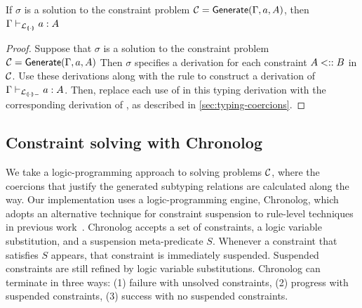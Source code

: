 \documentclass[runningheads]{llncs}
\begin{document}
\begin{lemma}
  \label{lem:generate-soundness}
  If $\sigma$ is a solution to the constraint problem $\mathcal{C} = \textsf{Generate}(\Gamma, a, A)$, then $\Gamma \vdash_{\mathcal{L}_{{\llparenthesis \cdot \rrparenthesis}}} a : A$
\end{lemma}
\begin{proof}
  Suppose that $\sigma$ is a solution to the constraint problem $\mathcal{C} = \textsf{Generate}(\Gamma, a, A)$
  Then $\sigma$ specifies a derivation for each constraint $A \mathrel{<::} B$ in $\mathcal{C}$.
  Use these derivations along with the rule  to construct a derivation of $\Gamma \vdash_{\mathcal{L}_{{\llparenthesis \cdot \rrparenthesis-}}} a : A$.
  Then, replace each use of  in this typing derivation with the corresponding derivation of , as described in \ref{sec:typing-coercions}.
\end{proof}



\subsection{Constraint solving with Chronolog}

We take a logic-programming approach to solving problems $\mathcal{C}$, where the coercions that justify the generated subtyping relations are
calculated along the way.
Our implementation uses a logic-programming engine, Chronolog, which adopts an alternative technique for constraint suspension to rule-level techniques in previous work~\cite{Clark1982,Naish1982,residuation2019}.
Chronolog accepts a set of constraints, a logic variable substitution, and a suspension meta-predicate $S$.
Whenever a constraint that satisfies $S$ appears, that constraint is immediately suspended.
Suspended constraints are still refined by logic variable substitutions.
Chronolog can terminate in three ways: (1) failure with unsolved constraints, (2) progress with suspended constraints, (3) success with no suspended constraints.
\end{document}
